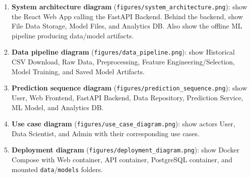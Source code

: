 \begin{enumerate}
    \item \textbf{System architecture diagram} (\texttt{figures/system\_architecture.png}): show the React Web App calling the FastAPI Backend. Behind the backend, show File Data Storage, Model Files, and Analytics DB. Also show the offline ML pipeline producing data/model artifacts.
    \item \textbf{Data pipeline diagram} (\texttt{figures/data\_pipeline.png}): show Historical CSV Download, Raw Data, Preprocessing, Feature Engineering/Selection, Model Training, and Saved Model Artifacts.
    \item \textbf{Prediction sequence diagram} (\texttt{figures/prediction\_sequence.png}): show User, Web Frontend, FastAPI Backend, Data Repository, Prediction Service, ML Model, and Analytics DB.
    \item \textbf{Use case diagram} (\texttt{figures/use\_case\_diagram.png}): show actors User, Data Scientist, and Admin with their corresponding use cases.
    \item \textbf{Deployment diagram} (\texttt{figures/deployment\_diagram.png}): show Docker Compose with Web container, API container, PostgreSQL container, and mounted \texttt{data}/\texttt{models} folders.
\end{enumerate}
